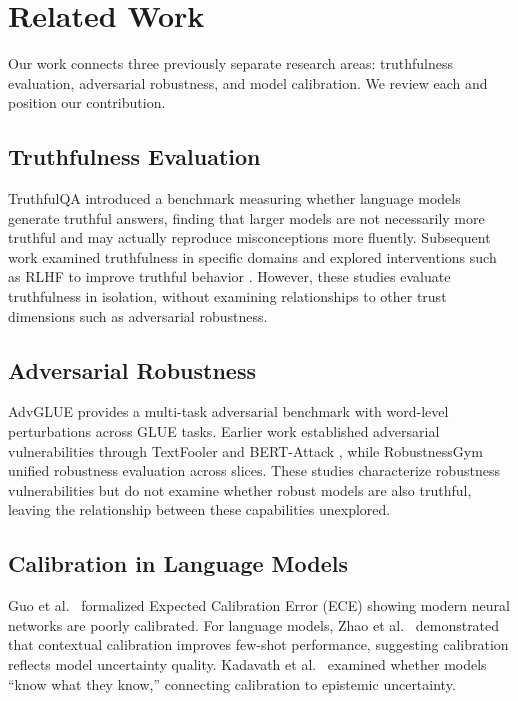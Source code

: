 \section{Related Work}
\label{sec:related}

Our work connects three previously separate research areas: truthfulness evaluation, adversarial robustness, and model calibration. We review each and position our contribution.

\subsection{Truthfulness Evaluation}

TruthfulQA \cite{lin2022truthfulqa} introduced a benchmark measuring whether language models generate truthful answers, finding that larger models are not necessarily more truthful and may actually reproduce misconceptions more fluently. Subsequent work examined truthfulness in specific domains \cite{evans2021truthful} and explored interventions such as RLHF to improve truthful behavior \cite{ouyang2022instructgpt}. However, these studies evaluate truthfulness in isolation, without examining relationships to other trust dimensions such as adversarial robustness.

\subsection{Adversarial Robustness}

AdvGLUE \cite{wang2022advglue} provides a multi-task adversarial benchmark with word-level perturbations across GLUE tasks. Earlier work established adversarial vulnerabilities through TextFooler \cite{jin2020textfooler} and BERT-Attack \cite{li2020bertattack}, while RobustnessGym \cite{goel2021robustnessgym} unified robustness evaluation across slices. These studies characterize robustness vulnerabilities but do not examine whether robust models are also truthful, leaving the relationship between these capabilities unexplored.

\subsection{Calibration in Language Models}

Guo et al.~\cite{guo2017calibration} formalized Expected Calibration Error (ECE) showing modern neural networks are poorly calibrated. For language models, Zhao et al.~\cite{zhao2021calibrate} demonstrated that contextual calibration improves few-shot performance, suggesting calibration reflects model uncertainty quality. Kadavath et al.~\cite{kadavath2022language} examined whether models ``know what they know,'' connecting calibration to epistemic uncertainty.

